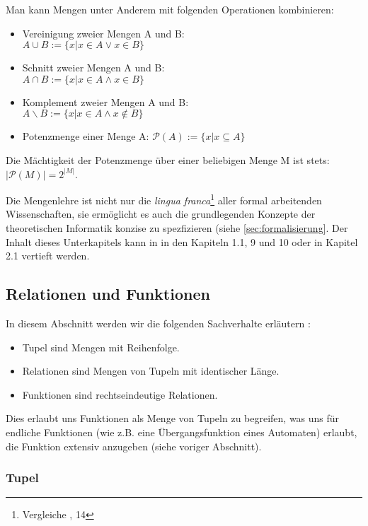 Man kann Mengen unter Anderem mit folgenden Operationen kombinieren:
\begin{itemize}
    \item Vereinigung zweier Mengen A und B:\\
        $A \cup B := \{x|x \in A \vee x \in B\}$
    \item Schnitt zweier Mengen A und B:\\
        $A \cap B := \{x|x \in A \wedge x \in B\}$
    \item Komplement zweier Mengen A und B:\\
        $A \backslash B:= \{x|x \in A \wedge x \notin B\}$
    \item Potenzmenge einer Menge A: $\mathcal{P}(A) := \{x|x \subseteq A\}$
\end{itemize}

Die Mächtigkeit der Potenzmenge über einer beliebigen Menge M ist stets:
$|\mathcal{P}(M)| = 2^{|M|}$.


Die Mengenlehre ist nicht nur die \emph{lingua franca}\footnote{Vergleiche \cite{link}, 14}
aller formal arbeitenden Wissenschaften,
sie ermöglicht es auch die grundlegenden Konzepte der theoretischen Informatik
konzise zu spezfizieren (siehe \autoref{sec:formalisierung}.
Der Inhalt dieses Unterkapitels kann in \cite{link}
in den Kapiteln 1.1, 9 und 10 oder in
\cite{hoffmann} Kapitel 2.1 vertieft werden.

\subsection{Relationen und Funktionen}\label{relationenUndFunktionen}
In diesem Abschnitt werden wir die folgenden Sachverhalte erläutern :
\begin{itemize}
    \item Tupel sind Mengen mit Reihenfolge.
    \item Relationen sind Mengen von Tupeln mit identischer Länge.
    \item Funktionen sind rechtseindeutige Relationen.
\end{itemize}
Dies erlaubt uns Funktionen als Menge von Tupeln zu begreifen,
was uns für endliche Funktionen
(wie z.B. eine Übergangsfunktion eines Automaten)
erlaubt,
die Funktion extensiv anzugeben (siehe voriger Abschnitt).

\subsubsection{Tupel}

